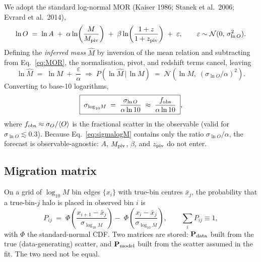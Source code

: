 \documentclass[11pt,a4paper]{article}
\begin{document}
We adopt the standard log-normal MOR (Kaiser 1986; Stanek et al.~2006;
Evrard et al.~2014),
\begin{equation}
    \ln O \;=\; \ln A
    \;+\; \alpha \ln\!\left(\frac{M}{M_{\rm piv}}\right)
    \;+\; \beta  \ln\!\left(\frac{1+z}{1+z_{\rm piv}}\right)
    \;+\; \varepsilon,
    \qquad \varepsilon \sim \mathcal{N}(0,\, \sigma_{\ln O}^{2}) .
    \label{eq:MOR}
\end{equation}
Defining the \emph{inferred mass} $\hat M$ by inversion of the mean
relation and subtracting from Eq.~\eqref{eq:MOR}, the normalisation,
pivot, and redshift terms cancel, leaving
\begin{equation}
    \ln \hat M \;=\; \ln M \;+\; \frac{\varepsilon}{\alpha}
    \;\Longrightarrow\;
    P(\ln \hat M \,|\, \ln M)
    \;=\; \mathcal{N}\!\left(\ln M,\; \left(\sigma_{\ln O}/\alpha\right)^{2}\right).
    \label{eq:invert}
\end{equation}
Converting to base-10 logarithms,
\begin{equation}
    \boxed{\;\sigma_{\log_{10}\! M} \;=\; \frac{\sigma_{\ln O}}{\alpha \ln 10}
    \;\approx\; \frac{f_{\rm obs}}{\alpha \ln 10}\;},
    \label{eq:sigmalogM}
\end{equation}
where $f_{\rm obs} \approx \sigma_O/\langle O \rangle$ is the fractional
scatter in the observable (valid for $\sigma_{\ln O} \lesssim 0.3$).
Because Eq.~\eqref{eq:sigmalogM} contains only the ratio
$\sigma_{\ln O}/\alpha$, the forecast is observable-agnostic: $A$,
$M_{\rm piv}$, $\beta$, and $z_{\rm piv}$ do not enter.

\subsection{Migration matrix}

On a grid of $\log_{10} M$ bin edges $\{x_i\}$ with true-bin centres
$\bar x_j$, the probability that a true-bin-$j$ halo is placed in
observed bin $i$ is
\begin{equation}
    P_{ij} \;=\;
    \Phi\!\left(\frac{x_{i+1} - \bar x_j}{\sigma_{\log_{10}\! M}}\right)
    -\;
    \Phi\!\left(\frac{x_i     - \bar x_j}{\sigma_{\log_{10}\! M}}\right),
    \qquad \sum_i P_{ij} \equiv 1,
    \label{eq:migration}
\end{equation}
with $\Phi$ the standard-normal CDF. Two matrices are stored:
$\mathbf{P}_{\rm data}$ built from the true (data-generating)
scatter, and $\mathbf{P}_{\rm model}$ built from the scatter assumed
in the fit. The two need not be equal.
\end{document}
